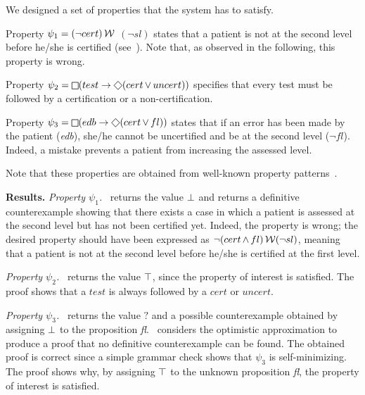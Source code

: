 We designed a set of properties that the system has to satisfy.
\begin{enumerate*}
\item[] Property $\psi_1=(\neg cert) \operatorname{\mathcal{W}}$ $(\neg sl)$ states that a patient is not at the second level before he/she is certified (see~\cite{ltlpatternsurl}). Note that, as observed in the following, this property is wrong.
\item[] Property  $\psi_2=\LTLglobally(test \rightarrow \LTLfinally(cert \LTLor uncert))$ specifies that every test must be followed by a certification or a non-certification.
\item[] Property  $\psi_3=\LTLglobally(edb \rightarrow \LTLfinally (cert \LTLor fl))$ states that if an error has been made by the patient (\emph{edb}), she/he cannot be uncertified and be at the second level ($\neg fl$). Indeed, a mistake prevents a patient from increasing the assessed level.
\end{enumerate*}
Note that these properties are obtained from well-known property patterns~\cite{dwyer1998property}.


\textbf{Results.} \emph{Property $\psi_1$.} 
 \NAME\  returns the value $\operatorname{\bot}$ and returns a definitive counterexample showing that there exists a case in which a patient is assessed at the second level but has not been certified yet.
Indeed, the property is wrong; the desired property should have been expressed  as $\neg(cert \operatorname{\wedge} fl) \operatorname{\mathcal{W}} (\neg sl)$, meaning that a patient is not at the second level before he/she is certified at the first level.

\emph{Property $\psi_2$.}  \NAME\ returns the value $\operatorname{\top}$, since the property of interest is satisfied. 
The proof shows that a $test$ is always followed by a $cert$ or $uncert$.


\emph{Property $\psi_3$.} 
\NAME\ returns the value $?$ and a possible counterexample obtained by assigning $\operatorname{\bot}$ to the proposition \emph{fl}. 
\NAME\ considers the optimistic approximation to produce a proof that no definitive counterexample can be found.
The obtained proof is correct since a simple grammar check shows that $\psi_3$ is self-minimizing. The proof shows why, by assigning $\operatorname{\top}$ to the unknown proposition \emph{fl}, the property of interest is satisfied.

